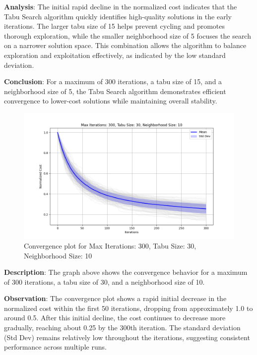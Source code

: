 \documentclass[
]{article}
\begin{document}
    \textbf{Analysis}: The initial rapid decline in the normalized cost indicates that the Tabu Search algorithm quickly identifies high-quality solutions in the early iterations. The larger tabu size of 15 helps prevent cycling and promotes thorough exploration, while the smaller neighborhood size of 5 focuses the search on a narrower solution space. This combination allows the algorithm to balance exploration and exploitation effectively, as indicated by the low standard deviation.

    \textbf{Conclusion}: For a maximum of 300 iterations, a tabu size of 15, and a neighborhood size of 5, the Tabu Search algorithm demonstrates efficient convergence to lower-cost solutions while maintaining overall stability.

    \begin{figure}[H]
        \centering
        \includegraphics[width=\textwidth]{tabu_search/max_iter_300_tabu_size_30_neighborhood_size_10}
        \caption{Convergence plot for Max Iterations: 300, Tabu Size: 30, Neighborhood Size: 10}
        \label{fig:ts_300_30_10}
    \end{figure}

    \textbf{Description}: The graph above shows the convergence behavior for a maximum of 300 iterations, a tabu size of 30, and a neighborhood size of 10.

    \textbf{Observation}: The convergence plot shows a rapid initial decrease in the normalized cost within the first 50 iterations, dropping from approximately 1.0 to around 0.5. After this initial decline, the cost continues to decrease more gradually, reaching about 0.25 by the 300th iteration. The standard deviation (Std Dev) remains relatively low throughout the iterations, suggesting consistent performance across multiple runs.
\end{document}
